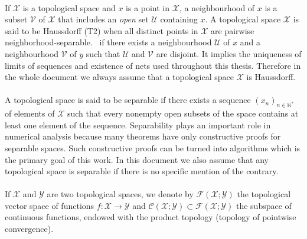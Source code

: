 \paragraph{}
If $\mathcal{X}$ is a topological space and $x$ is a point in $\mathcal{X}$, a neighbourhood of $x$ is a subset $\mathcal{V}$ of $\mathcal{X}$ that includes an \emph{open} set $\mathcal{U}$ containing $x$. A topological space $\mathcal{X}$ is said to be Haussdorff (T2) when all distinct points in $\mathcal{X}$ are pairwise neighborhood-separable. \Ie~if there exists a neighbourhood $\mathcal{U}$ of $x$ and a neighbourhood $\mathcal{V}$ of $y$ such that $\mathcal{U}$ and $\mathcal{V}$ are disjoint. It implies the uniqueness of limits of sequences and existence of nets used throughout this thesis. Therefore in the whole document we always assume that a topological space $\mathcal{X}$ is Haussdorff.
\paragraph{}
A topological space is said to be separable if there exists a sequence $(x_n)_{n\in\mathbb{N}^*}$ of elements of $\mathcal{X}$ such that every nonempty open subsets of the space contains at least one element of the sequence. Separability plays an important role in numerical analysis because many theorems have only constructive proofs for separable spaces. Such constructive proofs can be turned into algorithms which is the primary goal of this work. In this document we also assume that any topological space is separable if there is no specific mention of the contrary.
\paragraph{}
If $\mathcal{X}$ and $\mathcal{Y}$ are two topological spaces, we denote by $\mathcal{F}(\mathcal{X};\mathcal{Y})$ the topological vector space of functions $f:\mathcal{X}\to\mathcal{Y}$ and $\mathcal{C}(\mathcal{X};\mathcal{Y})\subset\mathcal{F}(\mathcal{X};\mathcal{Y})$ the subspace of continuous functions, endowed with the product topology (topology of pointwise convergence).

